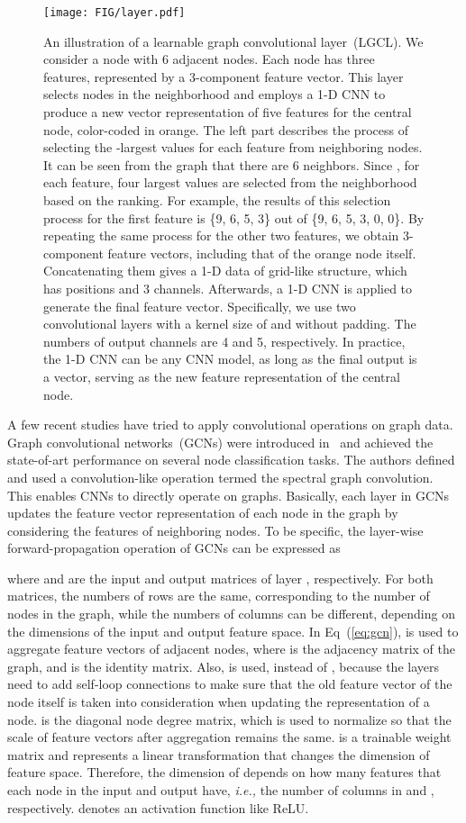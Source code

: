 \documentclass[sigconf]{acmart}
\begin{document}
\begin{figure*}[pt!] \texttt{[image: FIG/layer.pdf]}
\caption{An illustration of a learnable graph convolutional
layer~(LGCL). We consider a node with 6 adjacent nodes. Each node
has three features, represented by a 3-component feature vector.
This layer selects  nodes in the neighborhood and employs a 1-D
CNN to produce a new vector representation of five features for the
central node, color-coded in orange. The left part describes the
process of selecting the -largest values for each feature from
neighboring nodes. It can be seen from the graph that there are 6
neighbors. Since , for each feature, four largest values are
selected from the neighborhood based on the ranking. For example,
the results of this selection process for the first feature is \{9,
6, 5, 3\} out of \{9, 6, 5, 3, 0, 0\}. By repeating the same process
for the other two features, we obtain  3-component feature
vectors, including that of the orange node itself. Concatenating
them gives a 1-D data of grid-like structure, which has 
positions and 3 channels. Afterwards, a 1-D CNN is applied to
generate the final feature vector. Specifically, we use two
convolutional layers with a kernel size of  and without
padding. The numbers of output channels are 4 and 5, respectively.
In practice, the 1-D CNN can be any CNN model, as long as the final
output is a vector, serving as the new feature representation of the
central node.} \label{fig:layer}
\end{figure*}


A few recent studies have tried to apply convolutional operations on
graph data. Graph convolutional networks~(GCNs) were introduced
in~\cite{kipf2016semi} and achieved the state-of-art performance on
several node classification tasks. The authors defined and used a
convolution-like operation termed the spectral graph convolution.
This enables CNNs to directly operate on graphs. Basically, each
layer in GCNs updates the feature vector representation of each node
in the graph by considering the features of neighboring nodes. To be
specific, the layer-wise forward-propagation operation of GCNs can
be expressed as

where  and  are the input and output matrices of
layer , respectively. For both matrices, the numbers of rows are
the same, corresponding to the number of nodes in the graph, while
the numbers of columns can be different, depending on the dimensions
of the input and output feature space. In Eq~(\ref{eq:gcn}),
 is used to aggregate feature vectors of adjacent
nodes, where  is the adjacency matrix of the graph, and  is
the identity matrix. Also,  is used, instead of ,
because the layers need to add self-loop connections to make sure
that the old feature vector of the node itself is taken into
consideration when updating the representation of a node. 
is the diagonal node degree matrix, which is used to normalize
 so that the scale of feature vectors after aggregation
remains the same.  is a trainable weight matrix and
represents a linear transformation that changes the dimension of
feature space. Therefore, the dimension of  depends on how
many features that each node in the input and output have,
\emph{i.e.,} the number of columns in  and ,
respectively.  denotes an activation function like
ReLU.
\end{document}
